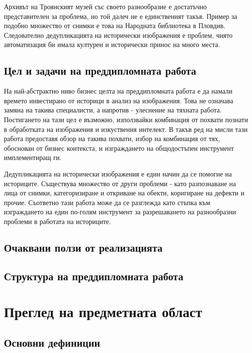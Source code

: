 \documentclass[a4paper,12pt]{article}
\begin{document}
\bigbreak

Архивът на Троянският музей със своето разнообразие е достатъчно представителен за проблема, но той далеч не е единственият такъв. Пример за подобно множество от снимки е това на Народната библиотека в Пловдив. Следователно дедупликацията на исторически изображения е проблем, чиято автоматизация би имала културен и исторически принос на много места.

\subsection{Цел и задачи на преддипломната работа}

На най-абстрактно ниво бизнес целта на преддипломната работа е да намали времето инвестирано от историци в анализ на изображения. Това не означава замяна на такива специалисти, а напротив - улеснение на тяхната работа. Постигането на тази цел е възможно, използвайки комбинация от похвати познати в обработката на изображения и изкуствения интелект. В такъв ред на мисли тази работа предоставя обзор на такива похвати, избор на комбинация от тях, обоснован от бизнес контекста, и изграждането на общодостъпен инструмент имплементиращ ги.

\bigbreak

Дедупликацията на исторически изображения е един начин да се помогне на историците. Съществува множество от други проблеми - като разпознаване на лица от снимки, категоризиране и откриване на обекти, коригиране на дефекти и прочие. Съответно тази работа може да се разглежда като стъпка към изграждането на един по-голям инструмент за разрешаването на разнообразни проблеми в работата на историците.

\subsection{Очаквани ползи от реализацията}


\subsection{Структура на преддипломната работа}

\section{Преглед на предметната област}

\subsection{Основни дефиниции}
\end{document}
